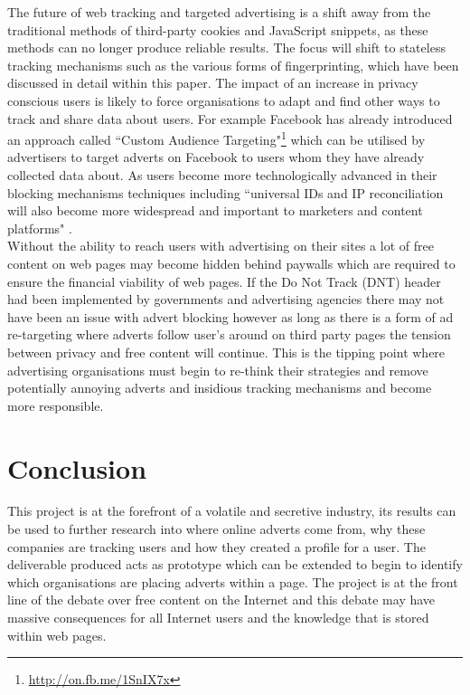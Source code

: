 \documentclass[12pt]{article}
\begin{document}
The future of web tracking and targeted advertising is a shift away from the traditional methods of third-party cookies and JavaScript snippets, as these methods can no longer produce reliable results. The focus will shift to stateless tracking mechanisms such as the various forms of fingerprinting, which have been discussed in detail within this paper. The impact of an increase in privacy conscious users is likely to force organisations to adapt and find other ways to track and share data about users. For example Facebook has already introduced an approach called ``Custom Audience  Targeting"\footnote{\url{http://on.fb.me/1SnIX7x}} which can be utilised by advertisers to target adverts on Facebook to users whom they have already collected data about. As users become more technologically advanced in their blocking mechanisms techniques including ``universal IDs and IP reconciliation will also become more widespread and important to marketers and content platforms" \parencite{tippingPoint}. \\

Without the ability to reach users with advertising on their sites a lot of free content on web pages may become hidden behind paywalls which are required to ensure the financial viability of web pages. If the Do Not Track (DNT) header had been implemented by governments  and advertising agencies there may not have been an issue with advert blocking however as long as there is a form of ad re-targeting where adverts follow user's around on third party pages the tension between privacy and free content will continue. This is the tipping point where advertising organisations must begin to re-think their strategies and remove potentially annoying adverts and insidious tracking mechanisms and become more responsible. 

\pagebreak

\section{Conclusion} \label{conclusion}
This project is at the forefront of a volatile and secretive industry, its results can be used to further research into where online adverts come from, why these companies are tracking users and how they created a profile for a user. The deliverable produced acts as prototype which can be extended to begin to identify which organisations are placing adverts within a page. The project is at the front line of the debate over free content on the Internet and this debate may have massive consequences for all Internet users and the knowledge that is stored within web pages. \\
\end{document}
